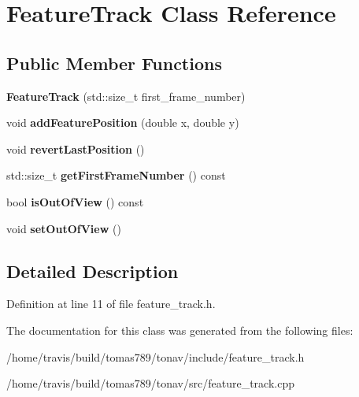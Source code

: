 \hypertarget{class_feature_track}{\section{Feature\-Track Class Reference}
\label{class_feature_track}
}
\subsection*{Public Member Functions}
\begin{DoxyCompactItemize}
\item 
\hypertarget{class_feature_track_ade7f659359480dab8f8ec7ace7625467}{{\bfseries Feature\-Track} (std\-::size\-\_\-t first\-\_\-frame\-\_\-number)}\label{class_feature_track_ade7f659359480dab8f8ec7ace7625467}

\item 
\hypertarget{class_feature_track_a5f13b226ac16fb0c9abe692c17f0f0c6}{void {\bfseries add\-Feature\-Position} (double x, double y)}\label{class_feature_track_a5f13b226ac16fb0c9abe692c17f0f0c6}

\item 
\hypertarget{class_feature_track_aa21cd2b1af1f2aaea1e7d19631f80474}{void {\bfseries revert\-Last\-Position} ()}\label{class_feature_track_aa21cd2b1af1f2aaea1e7d19631f80474}

\item 
\hypertarget{class_feature_track_a1635683732cdfda103a37d926d2efbf9}{std\-::size\-\_\-t {\bfseries get\-First\-Frame\-Number} () const }\label{class_feature_track_a1635683732cdfda103a37d926d2efbf9}

\item 
\hypertarget{class_feature_track_a966f8f018b7305d764216880f4a6f8ba}{bool {\bfseries is\-Out\-Of\-View} () const }\label{class_feature_track_a966f8f018b7305d764216880f4a6f8ba}

\item 
\hypertarget{class_feature_track_a75a507f6ac11d3a9319523d131c7949d}{void {\bfseries set\-Out\-Of\-View} ()}\label{class_feature_track_a75a507f6ac11d3a9319523d131c7949d}

\end{DoxyCompactItemize}


\subsection{Detailed Description}


Definition at line 11 of file feature\-\_\-track.\-h.



The documentation for this class was generated from the following files\-:\begin{DoxyCompactItemize}
\item 
/home/travis/build/tomas789/tonav/include/feature\-\_\-track.\-h\item 
/home/travis/build/tomas789/tonav/src/feature\-\_\-track.\-cpp\end{DoxyCompactItemize}
